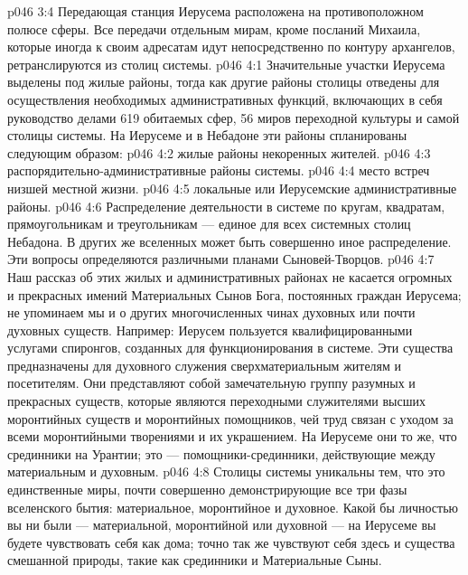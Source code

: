 \vs p046 3:4 \pc Передающая станция Иерусема расположена на противоположном полюсе сферы. Все передачи отдельным мирам, кроме посланий Михаила, которые иногда к своим адресатам идут непосредственно по контуру архангелов, ретранслируются из столиц системы.
\vs p046 4:1 Значительные участки Иерусема выделены под жилые районы, тогда как другие районы столицы отведены для осуществления необходимых административных функций, включающих в себя руководство делами 619 обитаемых сфер, 56 миров переходной культуры и самой столицы системы. На Иерусеме и в Небадоне эти районы спланированы следующим образом:
\vs p046 4:2 \bibnobreakspace {} жилые районы некоренных жителей.
\vs p046 4:3 \bibnobreakspace {} распорядительно\hyp{}административные районы системы.
\vs p046 4:4 \bibnobreakspace {} место встреч низшей местной жизни.
\vs p046 4:5 \bibnobreakspace {} локальные или Иерусемские административные районы.
\vs p046 4:6 \pc Распределение деятельности в системе по кругам, квадратам, прямоугольникам и треугольникам --- единое для всех системных столиц Небадона. В других же вселенных может быть совершенно иное распределение. Эти вопросы определяются различными планами Сыновей\hyp{}Творцов.
\vs p046 4:7 \pc Наш рассказ об этих жилых и административных районах не касается огромных и прекрасных имений Материальных Сынов Бога, постоянных граждан Иерусема; не упоминаем мы и о других многочисленных чинах духовных или почти духовных существ. Например: Иерусем пользуется квалифицированными услугами спиронгов, созданных для функционирования в системе. Эти существа предназначены для духовного служения сверхматериальным жителям и посетителям. Они представляют собой замечательную группу разумных и прекрасных существ, которые являются переходными служителями высших моронтийных существ и моронтийных помощников, чей труд связан с уходом за всеми моронтийными творениями и их украшением. На Иерусеме они то же, что срединники на Урантии; это --- помощники\hyp{}срединники, действующие между материальным и духовным.
\vs p046 4:8 Столицы системы уникальны тем, что это единственные миры, почти совершенно демонстрирующие все три фазы вселенского бытия: материальное, моронтийное и духовное. Какой бы личностью вы ни были --- материальной, моронтийной или духовной --- на Иерусеме вы будете чувствовать себя как дома; точно так же чувствуют себя здесь и существа смешанной природы, такие как срединники и Материальные Сыны.
